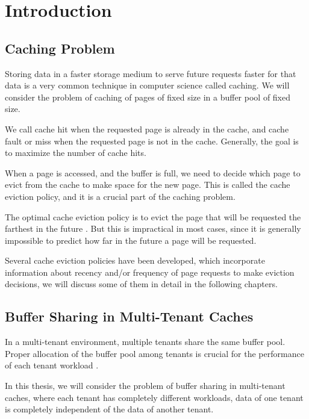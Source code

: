 \chapter{Introduction}

\section{Caching Problem}

Storing data in a faster storage medium to serve future requests faster for that data is a 
very common technique in computer science called caching. We will consider the problem 
of caching of pages of fixed size in a buffer pool of fixed size.

We call cache hit when the requested page is already in the cache, and cache fault or miss
when the requested page is not in the cache. Generally, the goal is to maximize the number
of cache hits.

When a page is accessed, and the buffer is full, we need to decide which page to evict
from the cache to make space for the new page. This is called the cache eviction policy,
and it is a crucial part of the caching problem.

The optimal cache eviction policy is to evict the page that will be requested the farthest
in the future \cite{lecture-notes-1} \cite{lecture-notes-2} \cite{article-for-belady-ref-1}.
But this is impractical in most cases, since it is generally impossible to predict how
far in the future a page will be requested.

Several cache eviction policies have been developed, which incorporate information
about recency and/or frequency of page requests to make eviction decisions, we will
discuss some of them in detail in the following chapters.

\section{Buffer Sharing in Multi-Tenant Caches}

In a multi-tenant environment, multiple tenants share the same buffer pool. Proper 
allocation of the buffer pool among tenants is crucial for the performance of each
tenant workload \cite{buffer-sharing-1}.

In this thesis, we will consider the problem of buffer sharing in multi-tenant caches,
where each tenant has completely different workloads, data of one tenant is completely
independent of the data of another tenant.

